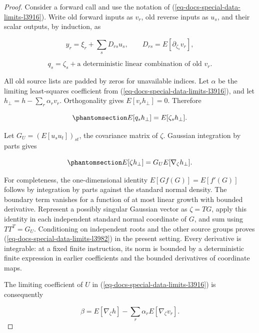 \documentclass[
  11pt,
]{article}
\theoremstyle{definition}
\theoremstyle{plain}
\theoremstyle{plain}
\theoremstyle{plain}
\theoremstyle{remark}
\begin{document}
\protect{}\label{proof-docs-special-data-limits-l3968}{}

\begin{proof}
Consider a forward call and use the notation of
(\ref{eq-docs-special-data-limits-l3916}). Write old forward inputs as
\(v_r\), old reverse inputs as \(u_s\), and their scalar outputs, by
induction, as

\[
y_r=\xi_r+\sum_s D_{rs}u_s,
\qquad D_{rs}=E[\partial_{\zeta_s}v_r],
\]

\[
q_s=\zeta_s+\text{a deterministic linear combination of old }v_r.
\]

All old source lists are padded by zeros for unavailable indices. Let
\(\alpha\) be the limiting least-squares coefficient from
(\ref{eq-docs-special-data-limits-l3916}), and let
\(h_\perp=h-\sum_r\alpha_rv_r\). Orthogonality gives
\(E[v_rh_\perp]=0\). Therefore

\begin{equation}\protect\phantomsection\label{eq-docs-special-data-limits-l3977}{
E[q_sh_\perp]=E[\zeta_sh_\perp].
}\end{equation}

Let \(G_U=(E[u_su_t])_{st}\), the covariance matrix of \(\zeta\).
Gaussian integration by parts gives

\begin{equation}\protect\phantomsection\label{eq-docs-special-data-limits-l3982}{
E[\zeta h_\perp]=G_U E[\nabla_\zeta h_\perp].
}\end{equation}

For completeness, the one-dimensional identity \(E[Gf(G)]=E[f'(G)]\)
follows by integration by parts against the standard normal density. The
boundary term vanishes for a function of at most linear growth with
bounded derivative. Represent a possibly singular Gaussian vector as
\(\zeta=T G\), apply this identity in each independent standard normal
coordinate of \(G\), and sum using \(TT^T=G_U\). Conditioning on
independent roots and the other source groups proves
(\ref{eq-docs-special-data-limits-l3982}) in the present setting. Every
derivative is integrable: at a fixed finite instruction, its norm is
bounded by a deterministic finite expression in earlier coefficients and
the bounded derivatives of coordinate maps.

The limiting coefficient of \(U\) in
(\ref{eq-docs-special-data-limits-l3916}) is consequently

\[
\beta=E[\nabla_\zeta h]-\sum_r\alpha_r E[\nabla_\zeta v_r].
\]


\end{proof}
\end{document}
